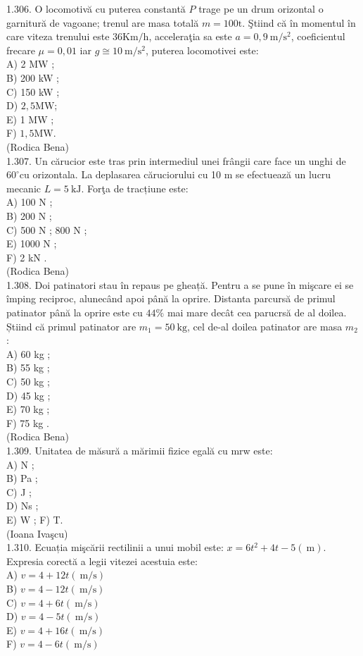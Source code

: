 {1.306. O locomotivă cu puterea constantă $P$ trage pe un drum orizontal o garnitură de vagoane; trenul are masa totală $m=100 \mathrm{t}$. Ştiind că în momentul în care viteza trenului este $36 \mathrm{Km} / \mathrm{h}$, acceleraţia sa este $a=0,9 \mathrm{~m} / \mathrm{s}^{2}$, coeficientul frecare $\mu=0,01$ iar $g \cong 10 \mathrm{~m} / \mathrm{s}^{2}$, puterea locomotivei este:\\
A) 2 MW ;\\
B) 200 kW ;\\
C) 150 kW ;\\
D) $2,5 \mathrm{MW}$;\\
E) 1 MW ;\\
F) $1,5 \mathrm{MW}$.\\
(Rodica Bena)\\
1.307. Un cărucior este tras prin intermediul unei frângii care face un unghi de $60^{\circ} \mathrm{cu}$ orizontala. La deplasarea căruciorului cu 10 m se efectuează un lucru mecanic $L=5 \mathrm{~kJ}$. Forţa de tracțiune este:\\
A) 100 N ;\\
B) 200 N ;\\
C) 500 N ; 800 N ;\\
E) 1000 N ;\\
F) 2 kN .\\
(Rodica Bena)\\
1.308. Doi patinatori stau în repaus pe gheață. Pentru a se pune în mişcare ei se împing reciproc, alunecând apoi până la oprire. Distanta parcursă de primul patinator până la oprire este cu $44 \%$ mai mare decât cea parucrsă de al doilea. Știind că primul patinator are $m_{1}=50 \mathrm{~kg}$, cel de-al doilea patinator are masa $m_{2}$ :\\
A) 60 kg ;\\
B) 55 kg ;\\
C) 50 kg ;\\
D) 45 kg ;\\
E) 70 kg ;\\
F) 75 kg .\\
(Rodica Bena)\\
1.309. Unitatea de măsură a mărimii fizice egală cu mrw este:\\
A) N ;\\
B) Pa ;\\
C) J ;\\
D) Ns ;\\
E) W ; F) T.\\
(Ioana Ivaşcu)\\
1.310. Ecuația mişcării rectilinii a unui mobil este: $x=6 t^{2}+4 t-5(\mathrm{~m})$. Expresia corectă a legii vitezei acestuia este:\\
A) $v=4+12 t(\mathrm{~m} / \mathrm{s})$\\
B) $v=4-12 t(\mathrm{~m} / \mathrm{s})$\\
C) $v=4+6 t(\mathrm{~m} / \mathrm{s})$\\
D) $v=4-5 t(\mathrm{~m} / \mathrm{s})$\\
E) $v=4+16 t(\mathrm{~m} / \mathrm{s})$\\
F) $v=4-6 t(\mathrm{~m} / \mathrm{s})$

}
